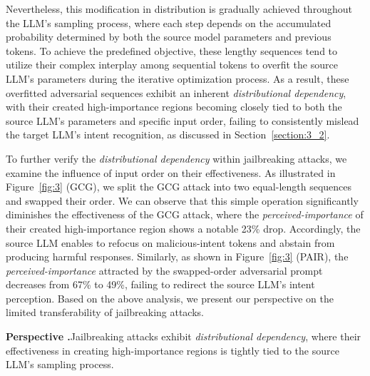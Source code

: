 Nevertheless, this modification in distribution is gradually achieved throughout the LLM's sampling process, where each step depends on the accumulated probability determined by both the source model parameters and previous tokens.
To achieve the predefined objective, these lengthy sequences tend to utilize their complex interplay among sequential tokens to overfit the source LLM's parameters during the iterative optimization process.
As a result, these overfitted adversarial sequences exhibit an inherent \emph{distributional dependency}, with their created high-importance regions becoming closely tied to both the source LLM's parameters and specific input order, failing to consistently mislead the target LLM's intent recognition, as discussed in Section~\ref{section:3_2}. 

To further verify the \emph{distributional dependency} within jailbreaking attacks, we examine the influence of input order on their effectiveness.
As illustrated in Figure~\ref{fig:3} (GCG), we split the GCG attack into two equal-length sequences and swapped their order.
We can observe that this simple operation significantly diminishes the effectiveness of the GCG attack, where the \emph{perceived-importance} of their created high-importance region shows a notable 23\% drop.
Accordingly, the source LLM enables to refocus on malicious-intent tokens and abstain from producing harmful responses.
Similarly, as shown in Figure~\ref{fig:3} (PAIR), the \emph{perceived-importance} attracted by the swapped-order adversarial prompt decreases from 67\% to 49\%, failing to redirect the source LLM's intent perception.
Based on the above analysis, we present our perspective on the limited transferability of jailbreaking attacks.

\begin{mdframed}[backgroundcolor=RefColor!15,linecolor=white,skipabove=6pt,skipbelow=0pt,innerleftmargin=3pt,innerrightmargin=3pt]
\textbf{Perspective \uppercase\expandafter{}.}\hspace*{2mm}Jailbreaking attacks exhibit \emph{distributional dependency}, where their effectiveness in creating high-importance regions is tightly tied to the source LLM's sampling process.
\end{mdframed}
\vspace{-0.8em}

\begin{figure*}[t]
    \centering
        \begin{subfigure}
        {
            \texttt{[image: image/Perspective.png]}
        }
        \end{subfigure}
    \vspace{-1.0em}
    \caption{The model's intent perception on the swapped-order GCG and PAIR attacks. The source \emph{perceived-importance} (PI) is measured on the Llama-2-7B-Chat.}
    \vspace{-1.4em}
    \label{fig:3}
\end{figure*}

